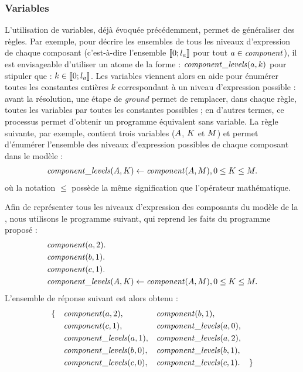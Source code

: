 \subsubsection{Variables}

L'utilisation de variables, déjà évoquée précédemment, permet de généraliser des règles.
Par exemple, pour décrire les ensembles de tous les niveaux d'expression de chaque composant
(c'est-à-dire l'ensemble $\mathopen{\llbracket}0\mathclose{};l_a\mathclose{\rrbracket}$ pour tout $a \in \mathit{component}$),
il est envisageable d'utiliser un atome de la forme : $\mathit{component\_levels}(a, k)$
pour stipuler que : $k \in \mathopen{\llbracket}0\mathclose{};l_a\mathclose{\rrbracket}$.
Les variables viennent alors en aide pour énumérer toutes les constantes entières $k$
correspondant à un niveau d'expression possible :
avant la résolution, une étape de \textit{ground} permet de remplacer, dans chaque règle,
toutes les variables par toutes les constantes possibles ;
en d'autres termes, ce processus permet d'obtenir un programme équivalent sans variable.
La règle suivante, par exemple, contient trois variables ($A$, $K$ et $M$)
et permet d'énumérer l'ensemble des niveaux d'expression possibles de chaque composant
dans le modèle :
\begin{align*}
  \mathit{component\_levels}(A, K) \leftarrow \mathit{component}(A, M), 0 \leq K \leq M.
\end{align*}
où la notation $\leq$ possède la même signification que l'opérateur mathématique.

\begin{example}
  Afin de représenter tous les niveaux d'expression des composants du modèle de la
  ,
  nous utilisons le programme suivant, qui reprend les faits du programme proposé
   :
  \begin{align*}
    &\mathit{component}(a, 2). \\
    &\mathit{component}(b, 1). \\
    &\mathit{component}(c, 1). \\
    &\mathit{component\_levels}(A, K) \leftarrow \mathit{component}(A, M), 0 \leq K \leq M.
  \end{align*}
  L'ensemble de réponse suivant est alors obtenu :
  \begin{align*}
    &\{&&\mathit{component}(a, 2),
    &&\mathit{component}(b, 1), \\
    &&&\mathit{component}(c, 1),
    &&\mathit{component\_levels}(a, 0), \\
    &&&\mathit{component\_levels}(a, 1),
    &&\mathit{component\_levels}(a, 2), \\
    &&&\mathit{component\_levels}(b, 0),
    &&\mathit{component\_levels}(b, 1), \\
    &&&\mathit{component\_levels}(c, 0),
    &&\mathit{component\_levels}(c, 1). &\}
  \end{align*}
\end{example}



